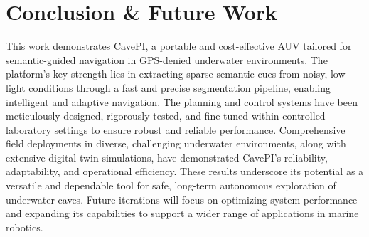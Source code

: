 \section{Conclusion \& Future Work} \label{sec:conclusion}
\vspace{-1mm}
This work demonstrates CavePI, a portable and cost-effective AUV tailored for semantic-guided navigation in GPS-denied underwater environments. The platform’s key strength lies in extracting sparse semantic cues from noisy, low-light conditions through a fast and precise segmentation pipeline, enabling intelligent and adaptive navigation. The planning and control systems have been meticulously designed, rigorously tested, and fine-tuned within controlled laboratory settings to ensure robust and reliable performance. Comprehensive field deployments in diverse, challenging underwater environments, along with extensive digital twin simulations, have demonstrated CavePI's reliability, adaptability, and operational efficiency. These results underscore its potential as a versatile and dependable tool for safe, long-term autonomous exploration of underwater caves. Future iterations will focus on optimizing system performance and expanding its capabilities to support a wider range of applications in marine robotics.


